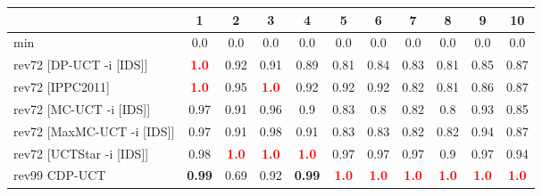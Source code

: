 \documentclass{article}
\begin{document}
\begin{tabular}{|l|r@{$\pm$}rr@{$\pm$}rr@{$\pm$}rr@{$\pm$}rr@{$\pm$}rr@{$\pm$}rr@{$\pm$}rr@{$\pm$}rr@{$\pm$}rr@{$\pm$}r|}
\hline

& \multicolumn{2}{c}{1}
& \multicolumn{2}{c}{2}
& \multicolumn{2}{c}{3}
& \multicolumn{2}{c}{4}
& \multicolumn{2}{c}{5}
& \multicolumn{2}{c}{6}
& \multicolumn{2}{c}{7}
& \multicolumn{2}{c}{8}
& \multicolumn{2}{c}{9}
& \multicolumn{2}{c|}{10}
\\
\hline
\hline
min
& \multicolumn{2}{c}{0.0}
& \multicolumn{2}{c}{0.0}
& \multicolumn{2}{c}{0.0}
& \multicolumn{2}{c}{0.0}
& \multicolumn{2}{c}{0.0}
& \multicolumn{2}{c}{0.0}
& \multicolumn{2}{c}{0.0}
& \multicolumn{2}{c}{0.0}
& \multicolumn{2}{c}{0.0}
& \multicolumn{2}{c|}{0.0}
\\
rev72 [DP-UCT -i [IDS]]
& \multicolumn{2}{c}{\textbf{\textcolor{red}{1.0}}}
& \multicolumn{2}{c}{0.92}
& \multicolumn{2}{c}{0.91}
& \multicolumn{2}{c}{0.89}
& \multicolumn{2}{c}{0.81}
& \multicolumn{2}{c}{0.84}
& \multicolumn{2}{c}{0.83}
& \multicolumn{2}{c}{0.81}
& \multicolumn{2}{c}{0.85}
& \multicolumn{2}{c|}{0.87}
\\
rev72 [IPPC2011]
& \multicolumn{2}{c}{\textbf{\textcolor{red}{1.0}}}
& \multicolumn{2}{c}{0.95}
& \multicolumn{2}{c}{\textbf{\textcolor{red}{1.0}}}
& \multicolumn{2}{c}{0.92}
& \multicolumn{2}{c}{0.92}
& \multicolumn{2}{c}{0.92}
& \multicolumn{2}{c}{0.82}
& \multicolumn{2}{c}{0.81}
& \multicolumn{2}{c}{0.86}
& \multicolumn{2}{c|}{0.87}
\\
rev72 [MC-UCT -i [IDS]]
& \multicolumn{2}{c}{0.97}
& \multicolumn{2}{c}{0.91}
& \multicolumn{2}{c}{0.96}
& \multicolumn{2}{c}{0.9}
& \multicolumn{2}{c}{0.83}
& \multicolumn{2}{c}{0.8}
& \multicolumn{2}{c}{0.82}
& \multicolumn{2}{c}{0.8}
& \multicolumn{2}{c}{0.93}
& \multicolumn{2}{c|}{0.85}
\\
rev72 [MaxMC-UCT -i [IDS]]
& \multicolumn{2}{c}{0.97}
& \multicolumn{2}{c}{0.91}
& \multicolumn{2}{c}{0.98}
& \multicolumn{2}{c}{0.91}
& \multicolumn{2}{c}{0.83}
& \multicolumn{2}{c}{0.83}
& \multicolumn{2}{c}{0.82}
& \multicolumn{2}{c}{0.82}
& \multicolumn{2}{c}{0.94}
& \multicolumn{2}{c|}{0.87}
\\
rev72 [UCTStar -i [IDS]]
& \multicolumn{2}{c}{0.98}
& \multicolumn{2}{c}{\textbf{\textcolor{red}{1.0}}}
& \multicolumn{2}{c}{\textbf{\textcolor{red}{1.0}}}
& \multicolumn{2}{c}{\textbf{\textcolor{red}{1.0}}}
& \multicolumn{2}{c}{0.97}
& \multicolumn{2}{c}{0.97}
& \multicolumn{2}{c}{0.97}
& \multicolumn{2}{c}{0.9}
& \multicolumn{2}{c}{0.97}
& \multicolumn{2}{c|}{0.94}
\\
\hline
rev99 CDP-UCT
& \multicolumn{2}{c}{\textbf{0.99}}
& \multicolumn{2}{c}{0.69}
& \multicolumn{2}{c}{0.92}
& \multicolumn{2}{c}{\textbf{0.99}}
& \multicolumn{2}{c}{\textbf{\textcolor{red}{1.0}}}
& \multicolumn{2}{c}{\textbf{\textcolor{red}{1.0}}}
& \multicolumn{2}{c}{\textbf{\textcolor{red}{1.0}}}
& \multicolumn{2}{c}{\textbf{\textcolor{red}{1.0}}}
& \multicolumn{2}{c}{\textbf{\textcolor{red}{1.0}}}
& \multicolumn{2}{c|}{\textbf{\textcolor{red}{1.0}}}
\\
\hline
\end{tabular}%
\end{document}
